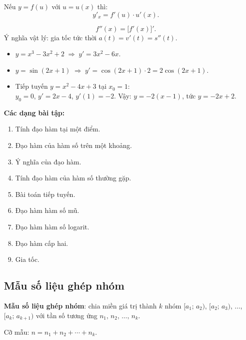 \documentclass[12pt,a4paper]{article}
\begin{document}
\begin{congthuc}[title={Đạo hàm hàm hợp}]
  Nếu $y = f(u)$ với $u = u(x)$ thì:
  \[
    y'_x = f'(u) \cdot u'(x).
  \]
\end{congthuc}

\begin{congthuc}[title={Đạo hàm cấp hai}]
  \[
    f''(x) = \bigl[f'(x)\bigr]'.
  \]
  Ý nghĩa vật lý: gia tốc tức thời $a(t) = v'(t) = s''(t)$.
\end{congthuc}

\begin{vidu}
  \begin{itemize}
    \item $y = x^3 - 3x^2 + 2 \;\Rightarrow\; y' = 3x^2 - 6x$.
    \item $y = \sin(2x + 1) \;\Rightarrow\; y' = \cos(2x + 1) \cdot 2 = 2\cos(2x + 1)$.
    \item Tiếp tuyến $y = x^2 - 4x + 3$ tại $x_0 = 1$: \\
      $y_0 = 0$, \;$y' = 2x - 4$, \;$y'(1) = -2$.
      Vậy: $y = -2(x - 1)$, tức $y = -2x + 2$.
  \end{itemize}
\end{vidu}

\medskip\noindent\textbf{Các dạng bài tập:}
\begin{enumerate}[label=\textbf{Dạng \arabic*:}, leftmargin=*, align=left]
  \item Tính đạo hàm tại một điểm.
  \item Đạo hàm của hàm số trên một khoảng.
  \item Ý nghĩa của đạo hàm.
  \item Tính đạo hàm của hàm số thường gặp.
  \item Bài toán tiếp tuyến.
  \item Đạo hàm hàm số mũ.
  \item Đạo hàm hàm số logarit.
  \item Đạo hàm cấp hai.
  \item Gia tốc.
\end{enumerate}

\subsection{Mẫu số liệu ghép nhóm}

\begin{dinhnghia}
  \textbf{Mẫu số liệu ghép nhóm}: chia miền giá trị thành $k$ nhóm
  $[a_1;\,a_2)$, $[a_2;\,a_3)$, $\ldots$, $[a_k;\,a_{k+1})$
  với tần số tương ứng $n_1,\, n_2,\, \ldots,\, n_k$.

  \medskip
  Cỡ mẫu: $n = n_1 + n_2 + \cdots + n_k$.
\end{dinhnghia}
\end{document}
